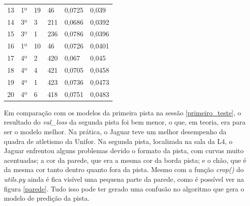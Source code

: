 \begin{table}[H]
\begin{tabular}{|l|l|l|l|l|l|}
13                   & 1º                   & 19             & 46                         & 0,0725                 & 0,039                       \\
14                   & 3º                   & 3              & 211                        & 0,0686                 & 0,0392                      \\
15                   & 3º                   & 1              & 236                        & 0,0786                 & 0,0396                      \\
16                   & 1º                   & 10             & 46                         & 0,0726                 & 0,0401                      \\
17                   & 4º                   & 2              & 420                        & 0,067                  & 0,045                       \\
18                   & 4º                   & 4              & 421                        & 0,0705                 & 0,0458                      \\
19                   & 4º                   & 1              & 423                        & 0,0736                 & 0,0473                      \\
20                   & 4º                   & 6              & 418                        & 0,0751                 & 0,0483 \\ \hline                    
\end{tabular}
\end{table}

Em comparação com os modelos da primeira pista na sessão \ref{primeiro_teste}, o resultado do \textit{val\_loss} da segunda pista foi bem menor, o que, em teoria, era para ser o modelo melhor. Na prática, o Jaguar teve um melhor desempenho da quadra de atletismo da Unifor. Na segunda pista, localizada na sala da L4, o Jaguar enfrentou alguns problemas devido o formato da pista, com curvas muito acentuadas; a cor da parede, que era a mesma cor da borda pista; e o chão, que é da mesma cor tanto dentro quanto fora da pista. Mesmo com a função \textit{crop()} do \textit{utils.py} ainda é fica visível uma pequena parte da parede, como é possível ver na figura \ref{parede}. Tudo isso pode ter gerado uma confusão no algoritmo que gera o modelo de predição da pista. 

	\begin{figure}[H]
		\centering
\end{figure}

